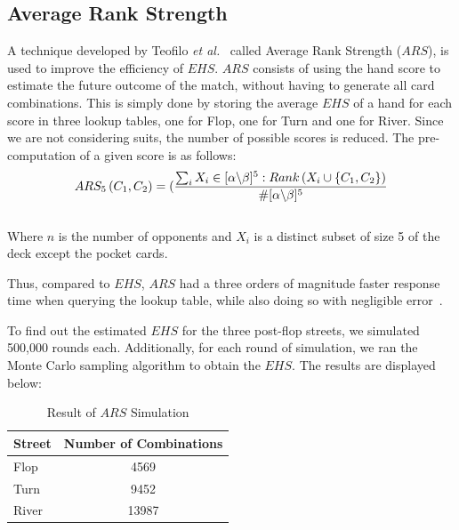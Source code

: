 \documentclass{article}
\begin{document}
\subsection{Average Rank Strength}

A technique developed by Teofilo \textit{et al.}~ called Average Rank Strength ($ARS$), is used to improve the efficiency of $EHS$. $ARS$ consists of using the hand score to estimate the future outcome of the match, without having to generate all card combinations. This is simply done by storing the average $EHS$ of a hand for each score in three lookup tables, one for Flop, one for Turn and one for River. Since we are not considering suits, the number of possible scores is reduced. The pre-computation of a given score is as follows:
\begin{displaymath}
  ARS_{5}\left(C_{1}, C_{2}\right)=(\frac{\sum_{i}X_{i} \in [\alpha \char`\\ \beta]^{5}:Rank \left(X_{i} \cup \left \lbrace C_{1}, C_{2} \right \rbrace \right)}{\#[\alpha \char`\\ \beta]^{5}}
\end{displaymath}\\
Where $n$ is the number of opponents and $X_i$ is a distinct subset of size 5 of the deck except the pocket cards.

Thus, compared to $EHS$, $ARS$ had a three orders of magnitude faster response time when querying the lookup table, while also doing so with negligible error~\cite{trc:ars}.

To find out the estimated $EHS$ for the three post-flop streets, we simulated 500,000 rounds each. Additionally, for each round of simulation, we ran the Monte Carlo sampling algorithm to obtain the $EHS$. The results are displayed below:

\begin{table}[h!]
  \begin{center}
    \begin{tabular}{l|c}
      \textbf{Street} & \textbf{Number of Combinations} \\
      \hline
      Flop & 4569 \\
      Turn & 9452 \\
      River & 13987 \\
    \end{tabular}
    \caption{Result of $ARS$ Simulation}
    \label{tab:table2}
  \end{center}
\end{table}
\end{document}

